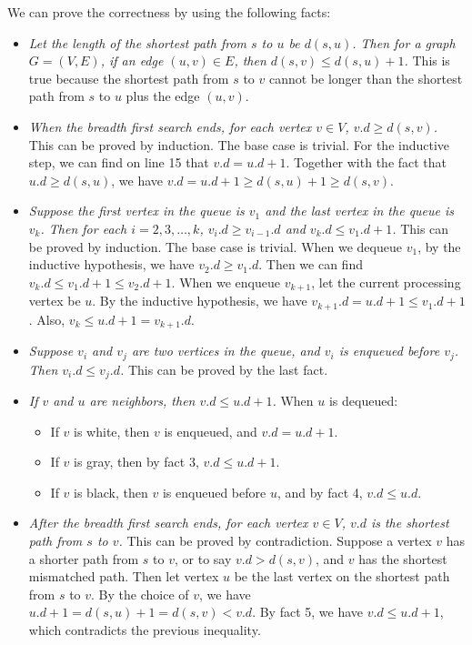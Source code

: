 \documentclass[a4paper,12pt]{article}
\begin{document}
We can prove the correctness by using the following facts:
\begin{itemize}
	\item \textit{Let the length of the shortest path from $s$ to $u$ be $d(s, u)$.
		Then for a graph $G = (V, E)$, if an edge $(u, v) \in E$, then $d(s, v) \leq d(s, u) + 1$.}
		This is true because the shortest path from $s$ to $v$ cannot be longer than the shortest path from $s$ to $u$ plus the edge $(u, v)$.
	\item \textit{When the breadth first search ends, for each vertex $v \in V$, $v.d \geq d(s, v)$.}
		This can be proved by induction.
		The base case is trivial.
		For the inductive step, we can find on line 15 that $v.d = u.d + 1$.
		Together with the fact that $u.d \geq d(s, u)$, we have $v.d = u.d + 1 \geq d(s, u) + 1 \geq d(s, v)$.
	\item \textit{Suppose the first vertex in the queue is $v_1$ and the last vertex in the queue is $v_k$.
		Then for each $i = 2, 3, \dots, k$, $v_i.d \geq v_{i - 1}.d$ and $v_k.d \leq v_1.d + 1$.}
		This can be proved by induction.
		The base case is trivial.
		When we dequeue $v_1$, by the inductive hypothesis, we have $v_2.d \geq v_1.d$.
		Then we can find $v_k.d \leq v_1.d + 1 \leq v_2.d + 1$.
		When we enqueue $v_{k+1}$, let the current processing vertex be $u$.
		By the inductive hypothesis, we have $v_{k + 1}.d = u.d + 1 \leq v_1.d + 1$.
		Also, $v_k \leq u.d + 1 = v_{k + 1}.d$.
	\item \textit{Suppose $v_i$ and $v_j$ are two vertices in the queue, and $v_i$ is enqueued before $v_j$.
		Then $v_i.d \leq v_j.d$.}
		This can be proved by the last fact.
	\item \textit{If $v$ and $u$ are neighbors, then $v.d \leq u.d + 1$.}
		When $u$ is dequeued:
		\begin{itemize}
			\item If $v$ is white, then $v$ is enqueued, and $v.d = u.d + 1$.
			\item If $v$ is gray, then by fact 3, $v.d \leq u.d + 1$.
			\item If $v$ is black, then $v$ is enqueued before $u$, and by fact 4, $v.d \leq u.d$.
		\end{itemize}
	\item \textit{After the breadth first search ends, for each vertex $v \in V$, $v.d$ is the shortest path from $s$ to $v$.}
		This can be proved by contradiction.
		Suppose a vertex $v$ has a shorter path from $s$ to $v$, or to say $v.d > d(s, v)$, and $v$ has the shortest mismatched path.
		Then let vertex $u$ be the last vertex on the shortest path from $s$ to $v$.
		By the choice of $v$, we have $u.d + 1  = d(s, u) + 1 = d(s, v) < v.d$.
		By fact 5, we have $v.d \leq u.d + 1$, which contradicts the previous inequality.
\end{itemize}
\end{document}
